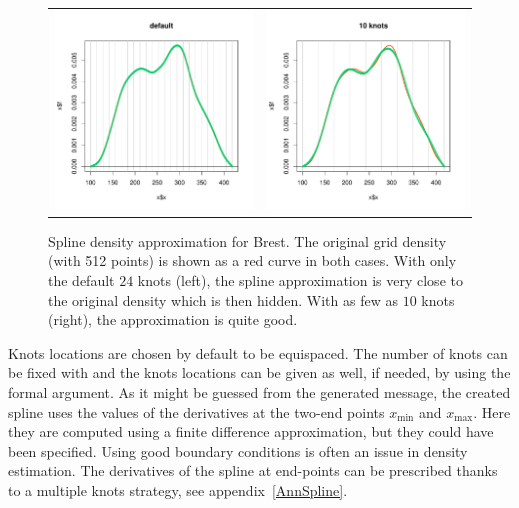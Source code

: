 \documentclass[11pt,a4paper]{report}\usepackage[]{graphicx}\usepackage[]{color}
\newcommand{\Low}[1]{#1_{\mathrm{min}}}
\newcommand{\Up}[1]{#1_{\mathrm{max}}}
\begin{document}
\begin{figure}
   \centering
   \begin{tabular}{c c} 
     \includegraphics[width=7.4cm]{Rgraphics/figSplineDens1-1.pdf} &
     \includegraphics[width=7.4cm]{Rgraphics/figSplineDens1-2.pdf} 
   \end{tabular}
   \caption{\label{FigSplineDens} Spline density approximation for
     Brest. The original grid density (with
     512 points) is shown as a red curve in both
     cases. With only the default $24$ knots (left), the spline
     approximation is very close to the original density which is then
     hidden. With as few as $10$ knots (right), the approximation is
     quite good.}
\end{figure}

\medskip 
{} 
Knots locations are chosen by default
to be equispaced. The number of knots can be fixed with \verb@nKnots@
and the knots locations can be given as well, if needed, by using the
\verb@knots@ formal argument.  As it might be guessed from the
generated message, the created spline uses the values of the
derivatives at the two-end points $\Low{x}$ and $\Up{x}$. Here they
are computed using a finite difference approximation, but they could
have been specified.  Using good boundary conditions is often an issue
in density estimation.  The derivatives of the spline at end-points
can be prescribed thanks to a multiple knots strategy,
see appendix~\ref{AnnSpline}.
\end{document}
